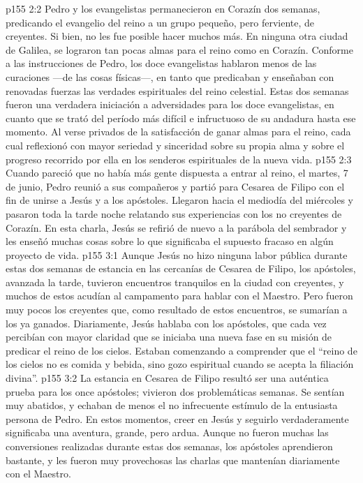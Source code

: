 \vs p155 2:2 Pedro y los evangelistas permanecieron en Corazín dos semanas, predicando el evangelio del reino a un grupo pequeño, pero ferviente, de creyentes. Si bien, no les fue posible hacer muchos más. En ninguna otra ciudad de Galilea, se lograron tan pocas almas para el reino como en Corazín. Conforme a las instrucciones de Pedro, los doce evangelistas hablaron menos de las curaciones ---de las cosas físicas---, en tanto que predicaban y enseñaban con renovadas fuerzas las verdades espirituales del reino celestial. Estas dos semanas fueron una verdadera iniciación a adversidades para los doce evangelistas, en cuanto que se trató del período más difícil e infructuoso de su andadura hasta ese momento. Al verse privados de la satisfacción de ganar almas para el reino, cada cual reflexionó con mayor seriedad y sinceridad sobre su propia alma y sobre el progreso recorrido por ella en los senderos espirituales de la nueva vida.
\vs p155 2:3 Cuando pareció que no había más gente dispuesta a entrar al reino, el martes, 7 de junio, Pedro reunió a sus compañeros y partió para Cesarea de Filipo con el fin de unirse a Jesús y a los apóstoles. Llegaron hacia el mediodía del miércoles y pasaron toda la tarde noche relatando sus experiencias con los no creyentes de Corazín. En esta charla, Jesús se refirió de nuevo a la parábola del sembrador y les enseñó muchas cosas sobre lo que significaba el supuesto fracaso en algún proyecto de vida.
\vs p155 3:1 Aunque Jesús no hizo ninguna labor pública durante estas dos semanas de estancia en las cercanías de Cesarea de Filipo, los apóstoles, avanzada la tarde, tuvieron encuentros tranquilos en la ciudad con creyentes, y muchos de estos acudían al campamento para hablar con el Maestro. Pero fueron muy pocos los creyentes que, como resultado de estos encuentros, se sumarían a los ya ganados. Diariamente, Jesús hablaba con los apóstoles, que cada vez percibían con mayor claridad que se iniciaba una nueva fase en su misión de predicar el reino de los cielos. Estaban comenzando a comprender que el “reino de los cielos no es comida y bebida, sino gozo espiritual cuando se acepta la filiación divina”.
\vs p155 3:2 La estancia en Cesarea de Filipo resultó ser una auténtica prueba para los once apóstoles; vivieron dos problemáticas semanas. Se sentían muy abatidos, y echaban de menos el no infrecuente estímulo de la entusiasta persona de Pedro. En estos momentos, creer en Jesús y seguirlo verdaderamente significaba una aventura, grande, pero ardua. Aunque no fueron muchas las conversiones realizadas durante estas dos semanas, los apóstoles aprendieron bastante, y les fueron muy provechosas las charlas que mantenían diariamente con el Maestro.

